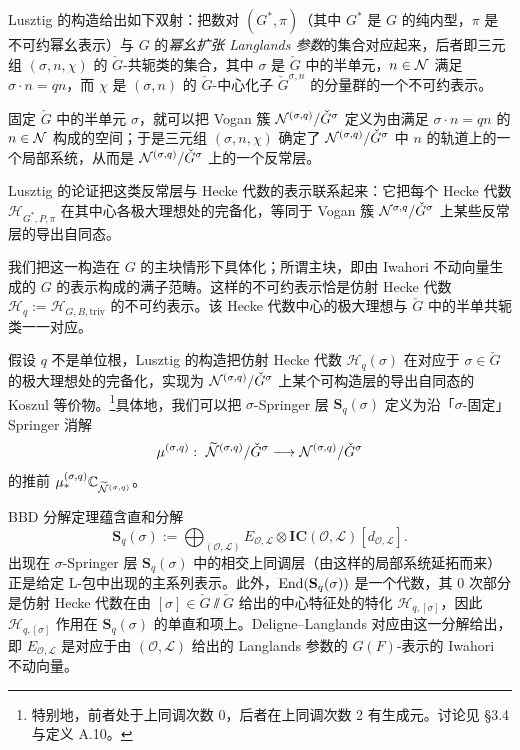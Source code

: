 Lusztig 的构造给出如下双射：把数对 $(G^*,\pi)$（其中 $G^*$ 是 $G$ 的纯内型，$\pi$ 是不可约幂幺表示）与 $G$ 的\emph{幂幺扩张 Langlands 参数}的集合对应起来，后者即三元组 $(\sigma,n,\chi)$ 的 $\check G$-共轭类的集合，其中 $\sigma$ 是 $\check G$ 中的半单元，$n\in\mathcal{N}$ 满足 $\sigma\cdot n=qn$，而 $\chi$ 是 $(\sigma,n)$ 的 $\check G$-中心化子 $\check G^{\sigma,n}$ 的分量群的一个不可约表示。

固定 $\check G$ 中的半单元 $\sigma$，就可以把 Vogan 簇 $\mathcal{N}^{(\sigma,q)}/\check G^\sigma$ 定义为由满足 $\sigma\cdot n=qn$ 的 $n\in\mathcal{N}$ 构成的空间；于是三元组 $(\sigma,n,\chi)$ 确定了 $\mathcal{N}^{(\sigma,q)}/\check G^\sigma$ 中 $n$ 的轨道上的一个局部系统，从而是 $\mathcal{N}^{(\sigma,q)}/\check G^\sigma$ 上的一个反常层。

Lusztig 的论证把这类反常层与 Hecke 代数的表示联系起来：它把每个 Hecke 代数 $\mathcal H_{G^*,P,\pi}$ 在其中心各极大理想处的完备化，等同于 Vogan 簇 $\mathcal{N}^{\sigma,q}/\check G^\sigma$ 上某些反常层的导出自同态。

我们把这一构造在 $G$ 的主块情形下具体化；所谓主块，即由 Iwahori 不动向量生成的 $G$ 的表示构成的满子范畴。这样的不可约表示恰是仿射 Hecke 代数 $\mathcal H_q:=\mathcal H_{G,B,\mathrm{triv}}$ 的不可约表示。该 Hecke 代数中心的极大理想与 $\check G$ 中的半单共轭类一一对应。

假设 $q$ 不是单位根，Lusztig 的构造把仿射 Hecke 代数 $\mathcal H_q(\sigma)$ 在对应于 $\sigma\in\check G$ 的极大理想处的完备化，实现为 $\mathcal{N}^{(\sigma,q)}/\check G^\sigma$ 上某个可构造层的导出自同态的 Koszul 等价物。\footnote{特别地，前者处于上同调次数 0，后者在上同调次数 2 有生成元。讨论见 §3.4 与定义 A.10。}具体地，我们可以把 $\sigma$-Springer 层 $\mathbf S_q(\sigma)$ 定义为沿「$\sigma$-固定」Springer 消解
\[
\mu^{(\sigma,q)}:\ \wt\NN^{(\sigma,q)}/\check G^\sigma\lra\NN^{(\sigma,q)}/\check G^\sigma
\]
的推前 $\mu^{(\sigma,q)}_*\mathbb C_{\widetilde{\mathcal{N}}^{(\sigma,q)}}$。

BBD 分解定理蕴含直和分解
\[
\mathbf S_q(\sigma):=\bigoplus_{(\mathcal O,\mathcal L)}E_{\mathcal O,\mathcal L}\otimes\mathbf{IC}(\mathcal O,\mathcal L)[d_{\mathcal O,\mathcal L}].
\]
出现在 $\sigma$-Springer 层 $\mathbf S_q(\sigma)$ 中的相交上同调层（由这样的局部系统延拓而来）正是给定 L-包中出现的主系列表示。此外，$\operatorname{End}(\mathbf S_q(\sigma))$ 是一个代数，其 0 次部分是仿射 Hecke 代数在由 $[\sigma]\in\check G\sslash\check G$ 给出的中心特征处的特化 $\mathcal H_{q,[\sigma]}$，因此 $\mathcal H_{q,[\sigma]}$ 作用在 $\mathbf S_q(\sigma)$ 的单直和项上。Deligne–Langlands 对应由这一分解给出，即 $E_{\mathcal O,\mathcal L}$ 是对应于由 $(\mathcal O,\mathcal L)$ 给出的 Langlands 参数的 $G(F)$-表示的 Iwahori 不动向量。

